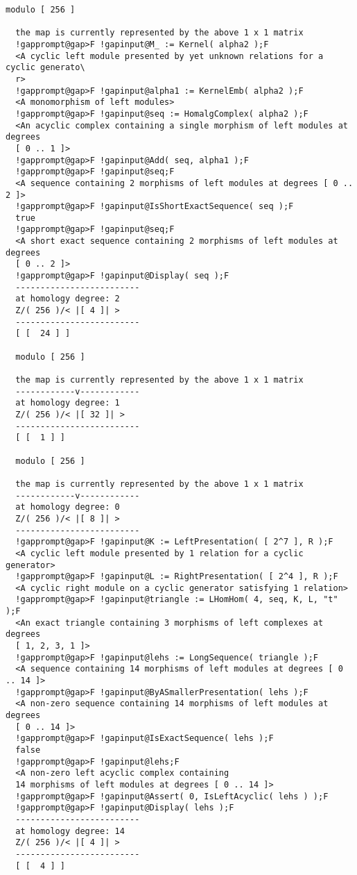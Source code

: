 \documentclass[a4paper,11pt]{report}
\begin{document}
{{{\begin{Verbatim}[commandchars=!@F,fontsize=\small,frame=single,label=Example]
  modulo [ 256 ]
  
  the map is currently represented by the above 1 x 1 matrix
  !gapprompt@gap>F !gapinput@M_ := Kernel( alpha2 );F
  <A cyclic left module presented by yet unknown relations for a cyclic generato\
  r>
  !gapprompt@gap>F !gapinput@alpha1 := KernelEmb( alpha2 );F
  <A monomorphism of left modules>
  !gapprompt@gap>F !gapinput@seq := HomalgComplex( alpha2 );F
  <An acyclic complex containing a single morphism of left modules at degrees 
  [ 0 .. 1 ]>
  !gapprompt@gap>F !gapinput@Add( seq, alpha1 );F
  !gapprompt@gap>F !gapinput@seq;F
  <A sequence containing 2 morphisms of left modules at degrees [ 0 .. 2 ]>
  !gapprompt@gap>F !gapinput@IsShortExactSequence( seq );F
  true
  !gapprompt@gap>F !gapinput@seq;F
  <A short exact sequence containing 2 morphisms of left modules at degrees 
  [ 0 .. 2 ]>
  !gapprompt@gap>F !gapinput@Display( seq );F
  -------------------------
  at homology degree: 2
  Z/( 256 )/< |[ 4 ]| > 
  -------------------------
  [ [  24 ] ]
  
  modulo [ 256 ]
  
  the map is currently represented by the above 1 x 1 matrix
  ------------v------------
  at homology degree: 1
  Z/( 256 )/< |[ 32 ]| > 
  -------------------------
  [ [  1 ] ]
  
  modulo [ 256 ]
  
  the map is currently represented by the above 1 x 1 matrix
  ------------v------------
  at homology degree: 0
  Z/( 256 )/< |[ 8 ]| > 
  -------------------------
  !gapprompt@gap>F !gapinput@K := LeftPresentation( [ 2^7 ], R );F
  <A cyclic left module presented by 1 relation for a cyclic generator>
  !gapprompt@gap>F !gapinput@L := RightPresentation( [ 2^4 ], R );F
  <A cyclic right module on a cyclic generator satisfying 1 relation>
  !gapprompt@gap>F !gapinput@triangle := LHomHom( 4, seq, K, L, "t" );F
  <An exact triangle containing 3 morphisms of left complexes at degrees 
  [ 1, 2, 3, 1 ]>
  !gapprompt@gap>F !gapinput@lehs := LongSequence( triangle );F
  <A sequence containing 14 morphisms of left modules at degrees [ 0 .. 14 ]>
  !gapprompt@gap>F !gapinput@ByASmallerPresentation( lehs );F
  <A non-zero sequence containing 14 morphisms of left modules at degrees 
  [ 0 .. 14 ]>
  !gapprompt@gap>F !gapinput@IsExactSequence( lehs );F
  false
  !gapprompt@gap>F !gapinput@lehs;F
  <A non-zero left acyclic complex containing 
  14 morphisms of left modules at degrees [ 0 .. 14 ]>
  !gapprompt@gap>F !gapinput@Assert( 0, IsLeftAcyclic( lehs ) );F
  !gapprompt@gap>F !gapinput@Display( lehs );F
  -------------------------
  at homology degree: 14
  Z/( 256 )/< |[ 4 ]| > 
  -------------------------
  [ [  4 ] ]
  

\end{Verbatim}}}}
\end{document}
